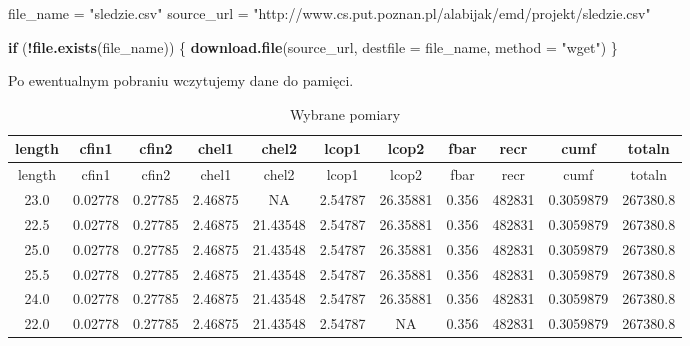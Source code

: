 \documentclass[]{article}
\newenvironment{Shaded}{\begin{snugshade}}{\end{snugshade}}
\newcommand{\ControlFlowTok}[1]{\textcolor[rgb]{0.13,0.29,0.53}{\textbf{#1}}}
\newcommand{\DataTypeTok}[1]{\textcolor[rgb]{0.13,0.29,0.53}{#1}}
\newcommand{\DecValTok}[1]{\textcolor[rgb]{0.00,0.00,0.81}{#1}}
\newcommand{\KeywordTok}[1]{\textcolor[rgb]{0.13,0.29,0.53}{\textbf{#1}}}
\newcommand{\NormalTok}[1]{#1}
\newcommand{\OperatorTok}[1]{\textcolor[rgb]{0.81,0.36,0.00}{\textbf{#1}}}
\newcommand{\OtherTok}[1]{\textcolor[rgb]{0.56,0.35,0.01}{#1}}
\newcommand{\StringTok}[1]{\textcolor[rgb]{0.31,0.60,0.02}{#1}}
\begin{document}
\begin{Shaded}
\begin{Highlighting}[]
\NormalTok{file_name =}\StringTok{ "sledzie.csv"}
\NormalTok{source_url =}\StringTok{ "http://www.cs.put.poznan.pl/alabijak/emd/projekt/sledzie.csv"}

\ControlFlowTok{if}\NormalTok{ (}\OperatorTok{!}\KeywordTok{file.exists}\NormalTok{(file_name)) \{}
  \KeywordTok{download.file}\NormalTok{(source_url, }\DataTypeTok{destfile =}\NormalTok{ file_name, }\DataTypeTok{method =} \StringTok{"wget"}\NormalTok{)}
\NormalTok{\}}
\end{Highlighting}
\end{Shaded}

Po ewentualnym pobraniu wczytujemy dane do pamięci.

\begin{Shaded}
\end{Shaded}

\begin{longtable}[]{@{}ccccccccccc@{}}
\caption{Wybrane pomiary}\tabularnewline
\toprule
length & cfin1 & cfin2 & chel1 & chel2 & lcop1 & lcop2 & fbar & recr &
cumf & totaln\tabularnewline
\midrule
\endfirsthead
\toprule
length & cfin1 & cfin2 & chel1 & chel2 & lcop1 & lcop2 & fbar & recr &
cumf & totaln\tabularnewline
\midrule
\endhead
23.0 & 0.02778 & 0.27785 & 2.46875 & NA & 2.54787 & 26.35881 & 0.356 &
482831 & 0.3059879 & 267380.8\tabularnewline
22.5 & 0.02778 & 0.27785 & 2.46875 & 21.43548 & 2.54787 & 26.35881 &
0.356 & 482831 & 0.3059879 & 267380.8\tabularnewline
25.0 & 0.02778 & 0.27785 & 2.46875 & 21.43548 & 2.54787 & 26.35881 &
0.356 & 482831 & 0.3059879 & 267380.8\tabularnewline
25.5 & 0.02778 & 0.27785 & 2.46875 & 21.43548 & 2.54787 & 26.35881 &
0.356 & 482831 & 0.3059879 & 267380.8\tabularnewline
24.0 & 0.02778 & 0.27785 & 2.46875 & 21.43548 & 2.54787 & 26.35881 &
0.356 & 482831 & 0.3059879 & 267380.8\tabularnewline
22.0 & 0.02778 & 0.27785 & 2.46875 & 21.43548 & 2.54787 & NA & 0.356 &
482831 & 0.3059879 & 267380.8\tabularnewline
\bottomrule
\end{longtable}
\end{document}
